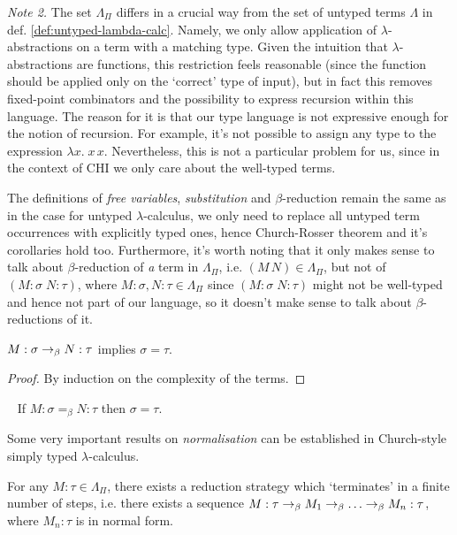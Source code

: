 \emph{Note 2.}
    The set $\Lambda_\Pi$ differs in a crucial way from the set of
    untyped terms $\Lambda$ in def.  \ref{def:untyped-lambda-calc}.
    Namely, we only allow application of $\lambda$-abstractions on a
    term with a matching type.  Given the intuition that
    $\lambda$-abstractions are functions, this restriction feels
    reasonable (since the function should be applied only on the
    `correct' type of input), but in fact this removes fixed-point
    combinators and the possibility to express recursion within this
    language. The reason for it is that our type language is not
    expressive enough for the notion of recursion. For example, it's
    not possible to assign any type to the expression $\lambda x.\; x\,
    x$. Nevertheless, this is not a particular problem for us, since in
    the context of CHI we only care about the well-typed terms.

The definitions of \emph{free variables}, \emph{substitution} and
$\beta$-reduction remain the same as in the case for untyped
$\lambda$-calculus, we only need to replace all untyped term occurrences with
explicitly typed ones, hence Church-Rosser theorem and it's corollaries hold
too. Furthermore, it's worth noting that it only makes sense to talk about
$\beta$-reduction of \emph{a} term in $\Lambda_\Pi$, i.e. $(M\, N) \in
\Lambda_\Pi$, but not of $(M\!:\!\sigma\; N\!:\!\tau)$, where $M:\sigma, N:\tau
\in \Lambda_\Pi$ since $(M\!:\!\sigma\; N\!:\!\tau)$ might not be well-typed
and hence not part of our language, so it doesn't make sense to talk about
$\beta$-reductions of it.

\begin{proposition}
    $M:\sigma \rightarrow_\beta N:\tau$ implies $\sigma = \tau$.
\end{proposition}
\begin{proof}
    By induction on the complexity of the terms.
\end{proof}

\begin{corollary} {\ }
\label{cor:uniquenessoftypes}
    If $M:\sigma =_\beta N:\tau$ then $\sigma = \tau$.
\end{corollary}

Some very important results on \emph{normalisation} can be established in
Church-style simply typed $\lambda$-calculus.
\begin{theorem}\label{thm:weaknorm}
    For any $M:\tau \in \Lambda_\Pi$, there exists a reduction strategy which
    `terminates' in a finite number of steps, i.e. there exists a sequence
    $M:\tau \rightarrow_\beta M_1 \rightarrow_\beta \ldots \rightarrow_\beta M_n:\tau$, where $M_n:\tau$
    is in normal form.
\end{theorem}

